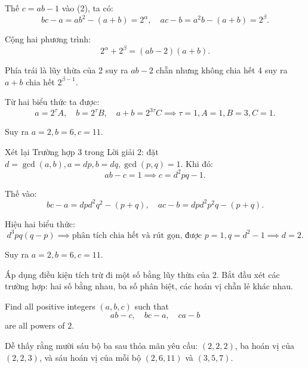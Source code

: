 \begin{problem}
\begin{soln}
    Thế \( c = ab - 1 \) vào (2), ta có:
    \[
        bc - a = ab^2 - (a + b) = 2^\alpha, \quad ac - b = a^2b - (a + b) = 2^\beta.
    \]

    Cộng hai phương trình:
    \[
        2^\alpha + 2^\beta = (ab - 2)(a + b).
    \]

    Phía trái là lũy thừa của 2 suy ra \( ab - 2 \) chẵn nhưng không chia hết 4 suy ra \( a + b \) chia hết \( 2^{\beta - 1} \).

    Từ hai biểu thức ta được:
    \[
        a = 2^\tau A, \quad b = 2^\tau B, \quad a + b = 2^{3\tau}C \implies \tau = 1, A = 1, B = 3, C = 1.
    \]

    Suy ra \( a = 2, b = 6, c = 11 \).
\end{soln}

\begin{remark*}
    Xét lại Trường hợp 3 trong Lời giải 2: đặt \( d = \gcd(a, b), a = dp, b = dq, \gcd(p, q) = 1 \). Khi đó:
    \[
        ab - c = 1 \implies c = d^2pq - 1.
    \]

    Thế vào:
    \[
        bc - a = dpd^2q^2 - (p + q), \quad ac - b = dpd^2p^2q - (p + q).
    \]

    Hiệu hai biểu thức:
    \[
        d^3pq(q - p) \implies \text{phân tích chia hết và rút gọn, được } p = 1, q = d^2 - 1 \implies d = 2.
    \]

    Suy ra \( a = 2, b = 6, c = 11 \).
\end{remark*}
\fi

\ifshowhint
\begin{hint*}
    Áp dụng điều kiện tích trừ đi một số bằng lũy thừa của 2. Bắt đầu xét các trường hợp: hai số bằng nhau, ba số phân biệt, các hoán vị chẵn lẻ khác nhau.
\end{hint*}
\fi

\ifshowproblemandsoln
\ifshowproblem\begin{problem}\label{problem:IMO-2015-P2}\fi
\ifshowsoln\begin{problem}\fi
    Find all positive integers $(a,b,c)$ such that
    $$ab-c,\quad bc-a,\quad ca-b$$are all powers of $2$.
\end{problem}
\fi

\ifshowsoln
\begin{soln}\footnotemark
    Dễ thấy rằng mười sáu bộ ba sau thỏa mãn yêu cầu: \( (2, 2, 2) \), ba hoán vị của \( (2, 2, 3) \), và sáu hoán vị của mỗi bộ \( (2, 6, 11) \) và \( (3, 5, 7) \).


\end{soln}
\end{problem}
\end{problem}
